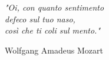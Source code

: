 \newlength\longest

\clearpage

\thispagestyle{empty}
\null\vfill

\settowidth{}
\begin{center}
    \parbox{\longest}{%
        \raggedright{\LARGE\itshape%
            "Oi, con quanto sentimento\\
            defeco sul tuo naso,\\
            così che ti coli sul mento."\par\bigskip
        }
        \raggedleft\Large{Wolfgang Amadeus Mozart}\par%
    }
\end{center}


\vfill\vfill

\clearpage